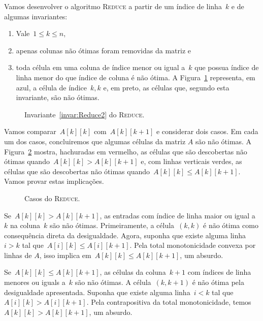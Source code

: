 Vamos desenvolver o algoritmo \textsc{Reduce} a partir de um índice de linha~$k$ e de algumas invariantes: 
\begin{enumerate}
    \item Vale~$1 \leq k \leq n$, \label{invar:Reduce0}
    \item apenas colunas não ótimas foram removidas da matriz e \label{invar:Reduce1}
    \item toda célula em uma coluna de índice menor ou igual a~$k$ que possua índice de linha menor do que índice de coluna é não ótima. A Figura~\ref{figure:Reduce1} representa, em azul, a célula de índice~$k,k$ e, em preto, as células que, segundo esta invariante, são não ótimas. \label{invar:Reduce2}
\end{enumerate}

\begin{figure}[h]
    \centering
    
    \caption{Invariante~\ref{invar:Reduce2} do \textsc{Reduce}.} \label{figure:Reduce1}
\end{figure}

Vamos comparar~$A[k][k]$ com~$A[k][k+1]$ e considerar dois casos. Em cada um dos casos, concluiremos que algumas células da matriz $A$ são não ótimas. A Figura~\ref{figure:Reduce2} mostra, hachuradas em vermelho, as células que são descobertas não ótimas quando~$A[k][k] > A[k][k+1]$ e, com linhas verticais verdes, as células que são descobertas não ótimas quando~$A[k][k] \leq A[k][k+1]$. Vamos provar estas implicações.

\begin{figure}[h]
    \centering
    
    \caption{Casos do \textsc{Reduce}.} \label{figure:Reduce2}
\end{figure}

Se~$A[k][k] > A[k][k+1]$, as entradas com índice de linha maior ou igual a~$k$ na coluna~$k$ são não ótimas. Primeiramente, a célula~$(k,k)$ é não ótima como consequência direta da desigualdade. Agora, suponha que existe alguma linha~$i>k$ tal que~$A[i][k] \leq A[i][k+1]$. Pela total monotonicidade convexa por linhas de $A$, isso implica em~$A[k][k] \leq A[k][k+1]$, um absurdo.  

Se~$A[k][k] \leq A[k][k+1]$, as células da coluna~$k+1$ com índices de linha menores ou iguals a~$k$ são não ótimas. A célula~$(k,k+1)$ é não ótima pela desigualdade apresentada. Suponha que existe alguma linha~$i<k$ tal que~$A[i][k] > A[i][k+1]$. Pela contrapositiva da total monotonicidade, temos~$A[k][k] > A[k][k+1]$, um absurdo.  

